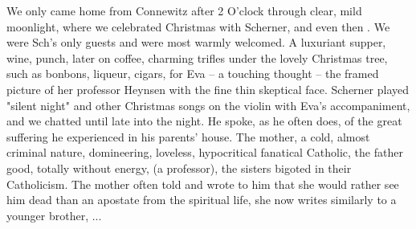 
We only came home from Connewitz after 2 O'clock through clear, mild moonlight, where we celebrated Christmas with Scherner, and even then  . We were Sch's only guests and were most warmly welcomed.
A luxuriant supper, wine, punch, later on coffee, charming trifles under the lovely Christmas tree, such as bonbons, liqueur, cigars, for Eva -- a touching thought -- the framed picture of her professor Heynsen with the fine thin skeptical face. Scherner played "silent night" and other Christmas songs on the violin with Eva's accompaniment, and we chatted until late into the night.
He spoke, as he often does, of the great suffering he experienced in his parents' house. The mother, a cold, almost criminal nature, domineering, loveless, hypocritical fanatical Catholic, the father good, totally without energy,  (a professor), the sisters bigoted in their Catholicism. The mother often told and wrote to him that she would rather see him dead than an apostate from the spiritual life, she now writes similarly to a younger brother, ...
